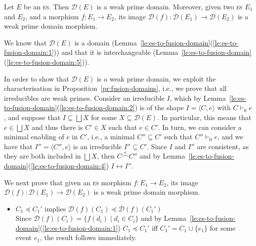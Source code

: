\documentclass[conference]{IEEEtran}
\renewenvironment{proof}{\begin{IEEEproof}}{\end{IEEEproof}}
\newcommand{\wi}{{interchangeable}}
\newcommand{\esabbr}{\textsc{es}}
\newcommand{\esir}[2]{\ensuremath{\langle{#1}, {#2}\rangle}}
\newcommand{\conn}[1]{\ensuremath{\stackrel{#1}{\frown}}}
\newcommand{\zdom}[0]{\ensuremath{\mathcal{D}}}
\newcommand{\dom}[1]{\ensuremath{\zdom({#1})}}
\begin{document}
\begin{proposition}
  \label{pr:es-to-dom}
  Let ${E}$ be an {\esabbr}.
  Then $\dom{{E}}$
  is a weak prime domain. Moreover, given two {\esabbr} $E_1$ and $E_2$, and  a morphism
  $f : {E}_1 \to {E}_2$, its image
  $\dom{f} : \dom{{E}_1} \to \dom{{E}_2}$ is a weak prime domain morphism.
\end{proposition}

\begin{proof}
  We know that
  $\dom{{E}}$ is a domain
  (Lemma~\ref{le:es-to-fusion-domain}(\ref{le:es-to-fusion-domain:1}))
  and that it is {\wi}
  (Lemma~\ref{le:es-to-fusion-domain}(\ref{le:es-to-fusion-domain:5})).
%  

  In order to show that $\dom{{E}}$ is a weak prime domain, we
  exploit the characterisation in Proposition~\ref{pr:fusion-domains},
  i.e., we prove that all irreducibles are weak primes.
  Consider an irreducible $I$, which by
  Lemma~\ref{le:es-to-fusion-domain}(\ref{le:es-to-fusion-domain:2})
  is of the shape $I = \esir{C}{e}$ with $C \vdash_0 e$, and suppose that
  $I \subseteq \bigsqcup X$ for some
  $X \subseteq \dom{{E}}$.
  In particular, this means that $e \in \bigsqcup X$ and thus there is
  $C' \in X$ such that $e \in C'$.  In turn, we can consider a minimal
  enabling of $e$ in $C'$, i.e., a minimal $C'' \subseteq C'$ such
  that $C'' \vdash_0 e$, and we have that $I'' = \esir{C''}{e}$ is an
  irreducible $I'' \subseteq C'$. Since $I$ and $I''$ are consistent,
  as they are both included in $\bigsqcup X$, then $C \conn{e} C''$
  and by
  Lemma~\ref{le:es-to-fusion-domain}(\ref{le:es-to-fusion-domain:4})
  $I \leftrightarrow I''$.

  \bigskip
  
  We next prove that given an {\esabbr} morphism
  $f : {E}_1 \to {E}_2$, its image
  $\dom{f} : \dom{{E}_1} \to \dom{{E}_2}$ is a weak prime
  domain morphism.
  \begin{itemize}
  \item $C_1 \preceq C_1'$ implies $\dom{f}(C_1) \preceq \dom{f}(C_1')$\\  
    Since $\dom{f}(C_i) = \{ f(d_i) \mid d_i \in C_i \}$ and by
    Lemma~\ref{le:es-to-fusion-domain}(\ref{le:es-to-fusion-domain:1})
    $C_1 \preceq C_1'$ iff $C_1' = C_1 \cup \{ e_1 \}$ for some event
    $e_1$, the result
    follows immediately.\\


\end{itemize}
\end{proof}
\end{document}
